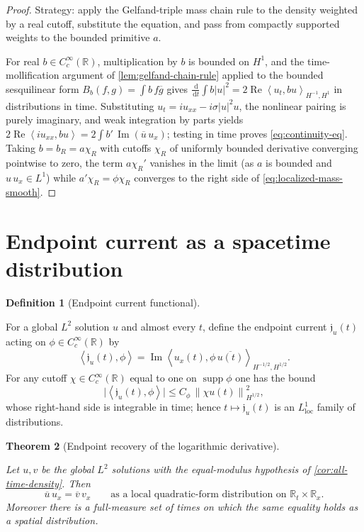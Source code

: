 \documentclass[11pt,oneside]{book}
\providecommand{\uses}[1]{}
\newtheorem{theorem}{Theorem}[chapter]
\theoremstyle{definition}
\newtheorem{definition}[theorem]{Definition}
\theoremstyle{remark}
\newcommand{\R}{\mathbb R}
\newcommand{\supp}{\operatorname{supp}}
\newcommand{\1}{\mathbf 1}
\newcommand{\loc}{\mathrm{loc}}
\newcommand{\Rea}{\operatorname{Re}}
\newcommand{\Ima}{\operatorname{Im}}
\newcommand{\dd}{\,\mathrm d}
\newcommand{\norm}[1]{\left\lVert #1\right\rVert}
\newcommand{\pair}[2]{\left\langle #1,#2\right\rangle}
\begin{document}
\begin{proof}
\uses{lem:gelfand-chain-rule}
Strategy: apply the Gelfand-triple mass chain rule to the density weighted by
a real cutoff, substitute the equation, and pass from compactly supported
weights to the bounded primitive $a$.

For real $b\in C_c^\infty(\R)$, multiplication by $b$ is bounded on $H^1$, and
the time-mollification argument of \cref{lem:gelfand-chain-rule} applied to the
bounded sesquilinear form $B_b(f,g)=\int b\,f\overline g$ gives
$\frac{\dd}{\dd t}\int b|u|^2=2\Rea\pair{u_t}{bu}_{H^{-1},H^1}$ in
distributions in time. Substituting $u_t=i u_{xx}-i\sigma|u|^2u$, the
nonlinear pairing is purely imaginary, and weak integration by parts yields
$2\Rea\pair{i u_{xx}}{bu}=2\int b'\,\Ima(\overline u\,u_x)$; testing in time
proves \eqref{eq:continuity-eq}. Taking $b=b_R=a\chi_R$ with cutoffs $\chi_R$
of uniformly bounded derivative converging pointwise to zero, the term
$a\chi_R'$ vanishes in the limit (as $a$ is bounded and $u\,u_x\in L^1$) while
$a'\chi_R=\phi\chi_R$ converges to the right side of
\eqref{eq:localized-mass-smooth}.
\end{proof}

\section{Endpoint current as a spacetime distribution}

\begin{definition}[Endpoint current functional]\label{def:endpoint-current}
\uses{def:quadratic-form-current, def:Hs-neg-pairing, lem:current-locality}
For a global $L^2$ solution $u$ and almost every $t$, define the endpoint
current $\mathfrak j_u(t)$ acting on $\phi\in C_c^\infty(\R)$ by
\begin{equation}
 \pair{\mathfrak j_u(t)}{\phi}
 =\Ima\pair{u_x(t)}{\phi\,\overline{u(t)}}_{H^{-1/2},H^{1/2}}.
 \label{eq:endpoint-current-def}
\end{equation}
For any cutoff $\chi\in C_c^\infty(\R)$ equal to one on $\supp\phi$ one has the
bound
\[
 \bigl|\pair{\mathfrak j_u(t)}{\phi}\bigr|
 \le C_\phi\,\norm{\chi u(t)}_{H^{1/2}}^2 ,
\]
whose right-hand side is integrable in time; hence $t\mapsto\mathfrak j_u(t)$
is an $L^1_{\loc}$ family of distributions.
\end{definition}

\begin{theorem}[Endpoint recovery of the logarithmic derivative]
\label{thm:current-recovery}
\uses{def:endpoint-current, def:quadratic-form-current}
Let $u,v$ be the global $L^2$ solutions with the equal-modulus hypothesis of
\cref{cor:all-time-density}. Then
\begin{equation}
 \overline u\,u_x=\overline v\,v_x
 \qquad\text{as a local quadratic-form distribution on }\R_t\times\R_x .
 \label{eq:log-derivative-equality}
\end{equation}
Moreover there is a full-measure set of times on which the same equality holds
as a spatial distribution.
\end{theorem}
\end{document}
